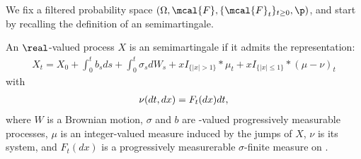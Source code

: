 We fix a filtered probability space $(\Omega, \mcal{F}, \{\mcal{F}_t\}_{t \ge 0}, \p)$, and start by recalling the definition of an \ito semimartingale. 
\begin{defn}
  An $\real$-valued process $X$ is an \ito semimartingale if it admits the representation:
  \begin{align}
    X_t = X_0 + \int^t_0 b_s ds + \int^t_0 \sigma_s d W_s  + x  I_{\{\vert x \vert > 1\}} \ast \mu_t  + x  I_{\{\vert x \vert \le  1\}} \ast (\mu - \nu)_t 
    \label{eq:semimartingale}
  \end{align}
  with 
  \begin{align}
    \nu(dt, dx) = F_t(dx) dt, \notag
    \label{}
  \end{align}
  where $W$ is a Brownian motion, $\sigma$ and $b$ are \real-valued progressively measurable processes, $\mu$ is an integer-valued measure induced by the jumps  of $X$, $\nu$ is its \levy system, and $F_t(dx)$ is a progressively measurerable $\sigma$-finite measure on \real.  
\end{defn}
